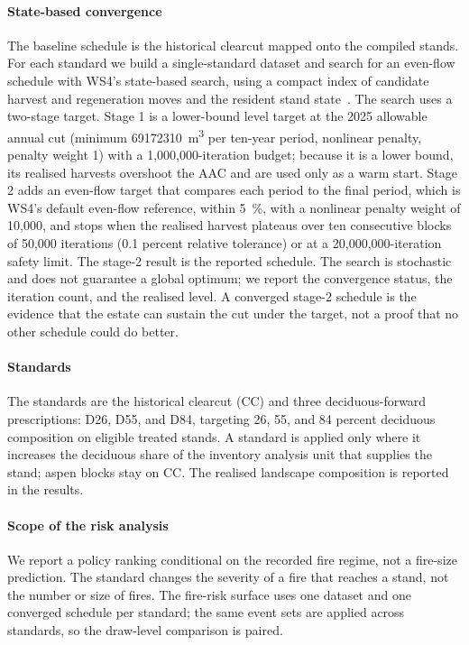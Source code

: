 \paragraph{State-based convergence} The baseline schedule is the historical clearcut mapped onto the compiled stands. For each
standard we build a single-standard dataset and search for an even-flow schedule with WS4's
state-based search, using a compact index of candidate harvest and regeneration moves and the
resident stand state~\citep{ubc_fresh_ws4_2026}. The search uses a two-stage target. Stage 1 is a lower-bound level target at the 2025 allowable annual cut
(minimum \SI{69172310}{\cubic\meter} per ten-year period, nonlinear penalty, penalty weight 1) with a
1,000,000-iteration budget; because it is a lower bound, its realised harvests overshoot the AAC and
are used only as a warm start. Stage 2 adds an even-flow target that compares each period to the
final period, which is WS4's default even-flow reference, within \SI{5}{\percent}, with a nonlinear penalty weight of
10,000, and stops when the realised harvest plateaus over ten consecutive blocks of 50,000 iterations (0.1
percent relative tolerance) or at a 20,000,000-iteration safety limit. The stage-2 result is the
reported schedule. The search is stochastic and does not guarantee a
global optimum; we report the convergence status, the iteration count, and the realised level. A
converged stage-2 schedule is the evidence that the estate can sustain the cut under the target, not
a proof that no other schedule could do better.

\paragraph{Standards} The standards are the historical clearcut (CC) and three deciduous-forward prescriptions: D26,
D55, and D84, targeting 26, 55, and 84 percent deciduous composition on eligible treated stands. A standard is applied only where it
increases the deciduous share of the inventory analysis unit that supplies the stand; aspen blocks
stay on CC. The
realised landscape composition is reported in the results.

\paragraph{Scope of the risk analysis} We report a policy ranking conditional on the recorded fire
regime, not a fire-size prediction. The standard changes the severity of a fire that reaches a
stand, not the number or size of fires. The fire-risk surface uses one dataset and one converged
schedule per standard; the same event sets are applied across standards, so the draw-level comparison is
paired.


